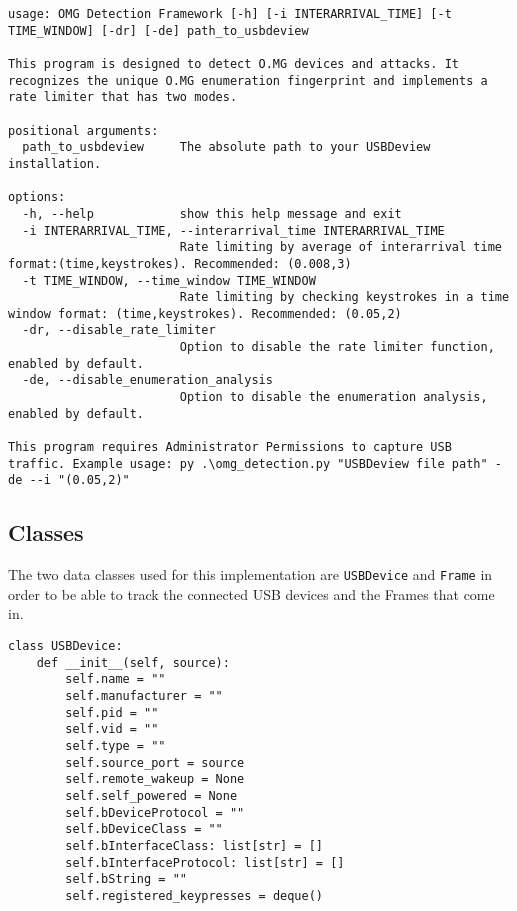 \begin{lstlisting}[caption={Defense Script Help Message }, label={defense_help_message}, captionpos=b]
usage: OMG Detection Framework [-h] [-i INTERARRIVAL_TIME] [-t TIME_WINDOW] [-dr] [-de] path_to_usbdeview

This program is designed to detect O.MG devices and attacks. It recognizes the unique O.MG enumeration fingerprint and implements a rate limiter that has two modes.

positional arguments:
  path_to_usbdeview     The absolute path to your USBDeview installation.

options:
  -h, --help            show this help message and exit
  -i INTERARRIVAL_TIME, --interarrival_time INTERARRIVAL_TIME
                        Rate limiting by average of interarrival time format:(time,keystrokes). Recommended: (0.008,3)
  -t TIME_WINDOW, --time_window TIME_WINDOW
                        Rate limiting by checking keystrokes in a time window format: (time,keystrokes). Recommended: (0.05,2)
  -dr, --disable_rate_limiter
                        Option to disable the rate limiter function, enabled by default.
  -de, --disable_enumeration_analysis
                        Option to disable the enumeration analysis, enabled by default.

This program requires Administrator Permissions to capture USB traffic. Example usage: py .\omg_detection.py "USBDeview file path" -de --i "(0.05,2)"

\end{lstlisting}



\subsection{Classes}

The two data classes used for this implementation are \verb|USBDevice| and \verb|Frame| in order to be able to track the connected USB devices and the Frames that come in.

\begin{lstlisting}[caption={USBDevice class definition},captionpos=b]
class USBDevice:
    def __init__(self, source):
        self.name = ""
        self.manufacturer = ""
        self.pid = ""
        self.vid = ""
        self.type = ""
        self.source_port = source
        self.remote_wakeup = None
        self.self_powered = None
        self.bDeviceProtocol = ""
        self.bDeviceClass = ""
        self.bInterfaceClass: list[str] = []
        self.bInterfaceProtocol: list[str] = []
        self.bString = ""
        self.registered_keypresses = deque()
\end{lstlisting}

